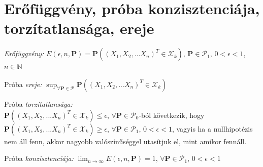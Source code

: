 \section{Erőfüggvény, próba konzisztenciája, torzítatlansága, ereje}

\emph{Erőfüggvény: } $E(\epsilon, n, \mathbf{P}) = \mathbf{P}((X_1,X_2,...X_n)^T \in \mathcal{X}_k)$, $\mathbf{P} \in \mathcal{P}_1$, $0<\epsilon<1$, $n \in \mathbb{N}$

Próba \emph{ereje:} $\sup_{\forall \mathbf{P} \in \mathcal{P}}\mathbf{P}((X_1,X_2,...X_n)^T \in \mathcal{X}_k)$

Próba \emph{torzítatlansága:} 
\\$\mathbf{P}((X_1,X_2,...X_n)^T \in \mathcal{X}_k) \leq \epsilon$, $\forall \mathbf{P} \in \mathcal{P}_0$-ból következik, hogy \\$\mathbf{P}((X_1,X_2,...X_n)^T \in \mathcal{X}_k) \geq \epsilon$, $\forall \mathbf{P} \in \mathcal{P}_1$, $0<\epsilon<1$, vagyis ha a nullhipotézis nem áll fenn, akkor nagyobb valószínűséggel utasítjuk el, mint amikor fennáll.

Próba \emph{konzisztenciája:} $\lim_{n\rightarrow\infty}E(\epsilon, n, \mathbf{P}) = 1$, $\forall \mathbf{P} \in \mathcal{P}_1$, $0<\epsilon<1$